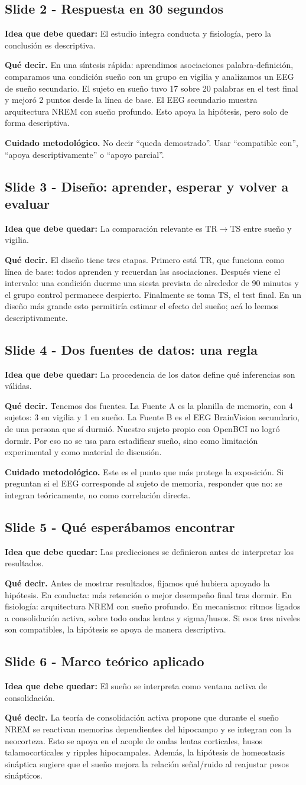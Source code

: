 \documentclass[11pt,a4paper]{article}
\newcommand{\slidehead}[3]{%
\subsection*{Slide #1 - #2}\textbf{Idea que debe quedar:} #3\par}
\newcommand{\decir}{\textbf{Qué decir.} }
\newcommand{\cuidado}{\textbf{Cuidado metodológico.} }
\begin{document}
\slidehead{2}{Respuesta en 30 segundos}{El estudio integra conducta y fisiología, pero la conclusión es descriptiva.}
\decir En una síntesis rápida: aprendimos asociaciones palabra-definición, comparamos una condición sueño con un grupo en vigilia y analizamos un EEG de sueño secundario. El sujeto en sueño tuvo 17 sobre 20 palabras en el test final y mejoró 2 puntos desde la línea de base. El EEG secundario muestra arquitectura NREM con sueño profundo. Esto apoya la hipótesis, pero solo de forma descriptiva.

\cuidado No decir ``queda demostrado''. Usar ``compatible con'', ``apoya descriptivamente'' o ``apoyo parcial''.

\slidehead{3}{Diseño: aprender, esperar y volver a evaluar}{La comparación relevante es TR$\rightarrow$TS entre sueño y vigilia.}
\decir El diseño tiene tres etapas. Primero está TR, que funciona como línea de base: todos aprenden y recuerdan las asociaciones. Después viene el intervalo: una condición duerme una siesta prevista de alrededor de 90 minutos y el grupo control permanece despierto. Finalmente se toma TS, el test final. En un diseño más grande esto permitiría estimar el efecto del sueño; acá lo leemos descriptivamente.

\slidehead{4}{Dos fuentes de datos: una regla}{La procedencia de los datos define qué inferencias son válidas.}
\decir Tenemos dos fuentes. La Fuente A es la planilla de memoria, con 4 sujetos: 3 en vigilia y 1 en sueño. La Fuente B es el EEG BrainVision secundario, de una persona que sí durmió. Nuestro sujeto propio con OpenBCI no logró dormir. Por eso no se usa para estadificar sueño, sino como limitación experimental y como material de discusión.

\cuidado Este es el punto que más protege la exposición. Si preguntan si el EEG corresponde al sujeto de memoria, responder que no: se integran teóricamente, no como correlación directa.

\slidehead{5}{Qué esperábamos encontrar}{Las predicciones se definieron antes de interpretar los resultados.}
\decir Antes de mostrar resultados, fijamos qué hubiera apoyado la hipótesis. En conducta: más retención o mejor desempeño final tras dormir. En fisiología: arquitectura NREM con sueño profundo. En mecanismo: ritmos ligados a consolidación activa, sobre todo ondas lentas y sigma/husos. Si esos tres niveles son compatibles, la hipótesis se apoya de manera descriptiva.

\slidehead{6}{Marco teórico aplicado}{El sueño se interpreta como ventana activa de consolidación.}
\decir La teoría de consolidación activa propone que durante el sueño NREM se reactivan memorias dependientes del hipocampo y se integran con la neocorteza. Esto se apoya en el acople de ondas lentas corticales, husos talamocorticales y ripples hipocampales. Además, la hipótesis de homeostasis sináptica sugiere que el sueño mejora la relación señal/ruido al reajustar pesos sinápticos.
\end{document}
